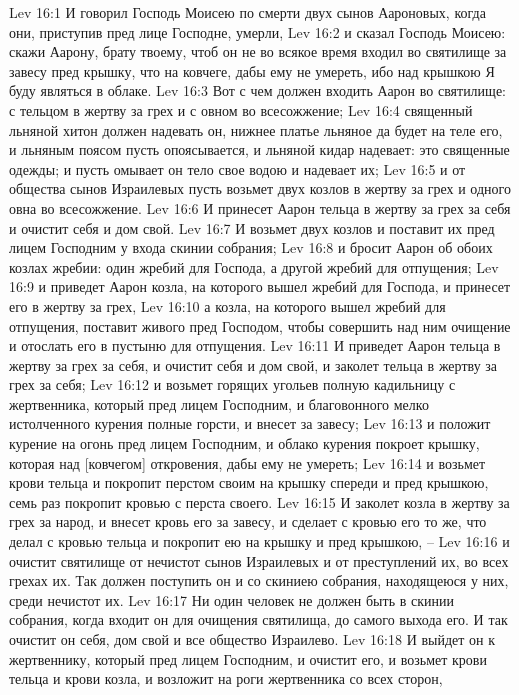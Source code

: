 Lev 16:1  И говорил Господь Моисею по смерти двух сынов Аароновых, когда они, приступив пред лице Господне, умерли,
Lev 16:2  и сказал Господь Моисею: скажи Аарону, брату твоему, чтоб он не во всякое время входил во святилище за завесу пред крышку, что на ковчеге, дабы ему не умереть, ибо над крышкою Я буду являться в облаке.
Lev 16:3  Вот с чем должен входить Аарон во святилище: с тельцом в жертву за грех и с овном во всесожжение;
Lev 16:4  священный льняной хитон должен надевать он, нижнее платье льняное да будет на теле его, и льняным поясом пусть опоясывается, и льняной кидар надевает: это священные одежды; и пусть омывает он тело свое водою и надевает их;
Lev 16:5  и от общества сынов Израилевых пусть возьмет двух козлов в жертву за грех и одного овна во всесожжение.
Lev 16:6  И принесет Аарон тельца в жертву за грех за себя и очистит себя и дом свой.
Lev 16:7  И возьмет двух козлов и поставит их пред лицем Господним у входа скинии собрания;
Lev 16:8  и бросит Аарон об обоих козлах жребии: один жребий для Господа, а другой жребий для отпущения;
Lev 16:9  и приведет Аарон козла, на которого вышел жребий для Господа, и принесет его в жертву за грех,
Lev 16:10  а козла, на которого вышел жребий для отпущения, поставит живого пред Господом, чтобы совершить над ним очищение и отослать его в пустыню для отпущения.
Lev 16:11  И приведет Аарон тельца в жертву за грех за себя, и очистит себя и дом свой, и заколет тельца в жертву за грех за себя;
Lev 16:12  и возьмет горящих угольев полную кадильницу с жертвенника, который пред лицем Господним, и благовонного мелко истолченного курения полные горсти, и внесет за завесу;
Lev 16:13  и положит курение на огонь пред лицем Господним, и облако курения покроет крышку, которая над [ковчегом] откровения, дабы ему не умереть;
Lev 16:14  и возьмет крови тельца и покропит перстом своим на крышку спереди и пред крышкою, семь раз покропит кровью с перста своего.
Lev 16:15  И заколет козла в жертву за грех за народ, и внесет кровь его за завесу, и сделает с кровью его то же, что делал с кровью тельца и покропит ею на крышку и пред крышкою, --
Lev 16:16  и очистит святилище от нечистот сынов Израилевых и от преступлений их, во всех грехах их. Так должен поступить он и со скиниею собрания, находящеюся у них, среди нечистот их.
Lev 16:17  Ни один человек не должен быть в скинии собрания, когда входит он для очищения святилища, до самого выхода его. И так очистит он себя, дом свой и все общество Израилево.
Lev 16:18  И выйдет он к жертвеннику, который пред лицем Господним, и очистит его, и возьмет крови тельца и крови козла, и возложит на роги жертвенника со всех сторон,
